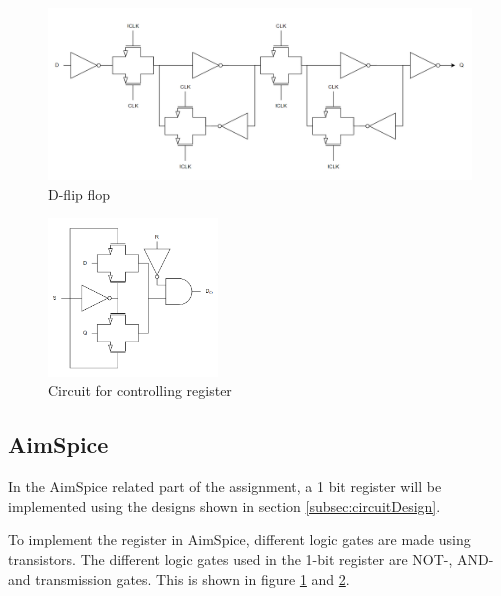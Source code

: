 \begin{figure}[H]
    \centering
    \includegraphics[width=\textwidth]{Figures/D_Flip_Flop.png}
    \caption{D-flip flop}
    \label{fig:dflipflop}
\end{figure}

\begin{figure}[H]
    \centering
    \includegraphics[width=0.4\textwidth]{Figures/setReset.png}
    \caption{Circuit for controlling register}
    \label{fig:setreset}
\end{figure}



\subsection{AimSpice}
In the AimSpice related part of the assignment, a 1 bit register will be implemented using the designs shown in section \ref{subsec:circuitDesign}. 

To implement the register in AimSpice, different logic gates are made using transistors. The different logic gates used in the 1-bit register are NOT-, AND- and transmission gates. This is shown in figure \ref{fig:dflipflop} and \ref{fig:setreset}.

